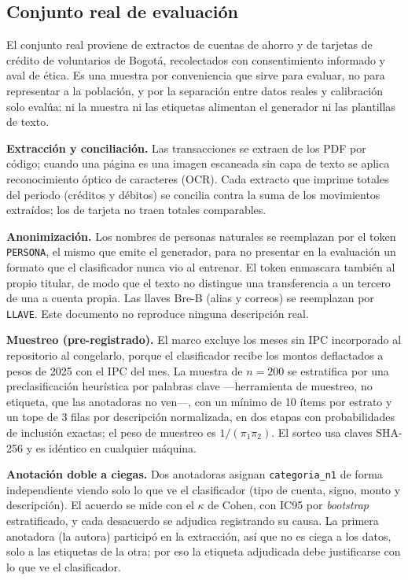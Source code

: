 \documentclass[journal]{IEEEtai}
\begin{document}
\subsection{Conjunto real de evaluación}
\label{sec:real}
El conjunto real proviene de extractos de cuentas de ahorro y de tarjetas de crédito de voluntarios de Bogotá, recolectados con consentimiento informado y aval de ética. Es una muestra por conveniencia que sirve para evaluar, no para representar a la población, y por la separación entre datos reales y calibración solo evalúa: ni la muestra ni las etiquetas alimentan el generador ni las plantillas de texto.

\textbf{Extracción y conciliación.} Las transacciones se extraen de los PDF por código; cuando una página es una imagen escaneada sin capa de texto se aplica reconocimiento óptico de caracteres (OCR). Cada extracto que imprime totales del periodo (créditos y débitos) se concilia contra la suma de los movimientos extraídos; los de tarjeta no traen totales comparables.

\textbf{Anonimización.} Los nombres de personas naturales se reemplazan por el token \texttt{PERSONA}, el mismo que emite el generador, para no presentar en la evaluación un formato que el clasificador nunca vio al entrenar. El token enmascara también al propio titular, de modo que el texto no distingue una transferencia a un tercero de una a cuenta propia. Las llaves Bre-B (alias y correos) se reemplazan por \texttt{LLAVE}. Este documento no reproduce ninguna descripción real.

\textbf{Muestreo (pre-registrado).} El marco excluye los meses sin IPC incorporado al repositorio al congelarlo, porque el clasificador recibe los montos deflactados a pesos de 2025 con el IPC del mes. La muestra de $n=200$ se estratifica por una preclasificación heurística por palabras clave —herramienta de muestreo, no etiqueta, que las anotadoras no ven—, con un mínimo de 10 ítems por estrato y un tope de 3 filas por descripción normalizada, en dos etapas con probabilidades de inclusión exactas; el peso de muestreo es $1/(\pi_1\pi_2)$. El sorteo usa claves SHA-256 y es idéntico en cualquier máquina.

\textbf{Anotación doble a ciegas.} Dos anotadoras asignan \texttt{categoria\_n1} de forma independiente viendo solo lo que ve el clasificador (tipo de cuenta, signo, monto y descripción). El acuerdo se mide con el $\kappa$ de Cohen, con IC95 por \textit{bootstrap} estratificado, y cada desacuerdo se adjudica registrando su causa. La primera anotadora (la autora) participó en la extracción, así que no es ciega a los datos, solo a las etiquetas de la otra; por eso la etiqueta adjudicada debe justificarse con lo que ve el clasificador.
\end{document}
